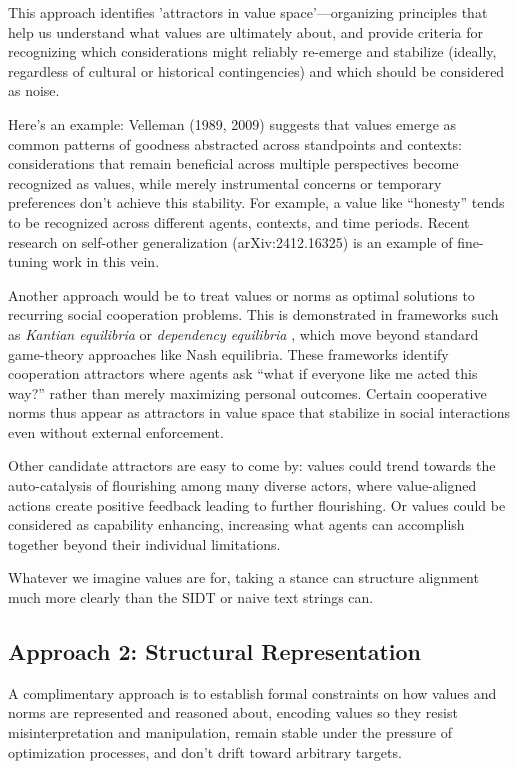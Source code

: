 This approach identifies 'attractors in value space'—organizing principles that help us understand what values are ultimately about, and provide criteria for recognizing which considerations might reliably re-emerge and stabilize (ideally, regardless of cultural or historical contingencies) and which should be considered as noise.

Here's an example: Velleman (1989, 2009) suggests that values emerge as common patterns of goodness abstracted across standpoints and contexts: considerations that remain beneficial across multiple perspectives become recognized as values, while merely instrumental concerns or temporary preferences don't achieve this stability. For example, a value like ``honesty'' tends to be recognized across different agents, contexts, and time periods. Recent research on self-other generalization (arXiv:2412.16325) is an example of fine-tuning work in this vein.

Another approach would be to treat values or norms as optimal solutions to recurring social cooperation problems. This is demonstrated in frameworks such as \textit{Kantian equilibria} \cite{roemer2010} or \textit{dependency equilibria} \cite{spohn2003}, which move beyond standard game-theory approaches like Nash equilibria. These frameworks identify cooperation attractors where agents ask ``what if everyone like me acted this way?'' rather than merely maximizing personal outcomes. Certain cooperative norms thus appear as attractors in value space that stabilize in social interactions even without external enforcement.

Other candidate attractors are easy to come by: values could trend towards the auto-catalysis of flourishing among many diverse actors, where value-aligned actions create positive feedback leading to further flourishing. Or values could be considered as capability enhancing, increasing what agents can accomplish together beyond their individual limitations.

Whatever we imagine values are for, taking a stance can structure alignment much more clearly than the SIDT or naive text strings can.

\subsection{Approach 2: Structural Representation}

A complimentary approach is to establish formal constraints on how values and norms are represented and reasoned about, encoding values so they resist misinterpretation and manipulation, remain stable under the pressure of optimization processes, and don't drift toward arbitrary targets.

